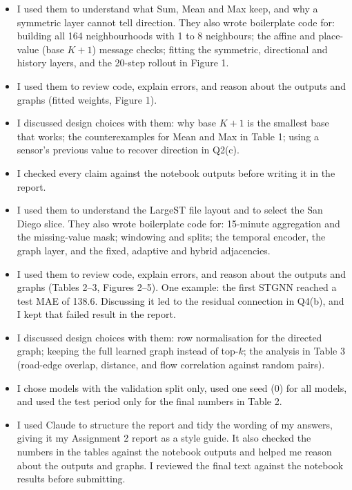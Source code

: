 
\begin{itemize}
    \item I used them to understand what Sum, Mean and Max keep, and why a symmetric layer cannot tell direction. They also wrote boilerplate code for: building all 164 neighbourhoods with 1 to 8 neighbours; the affine and place-value (base $K+1$) message checks; fitting the symmetric, directional and history layers, and the 20-step rollout in Figure 1.
    \item I used them to review code, explain errors, and reason about the outputs and graphs (fitted weights, Figure 1).
    \item I discussed design choices with them: why base $K+1$ is the smallest base that works; the counterexamples for Mean and Max in Table 1; using a sensor's previous value to recover direction in Q2(c).
    \item I checked every claim against the notebook outputs before writing it in the report.
\end{itemize}

\begin{itemize}
    \item I used them to understand the LargeST file layout and to select the San Diego slice. They also wrote boilerplate code for: 15-minute aggregation and the missing-value mask; windowing and splits; the temporal encoder, the graph layer, and the fixed, adaptive and hybrid adjacencies.
    \item I used them to review code, explain errors, and reason about the outputs and graphs (Tables 2--3, Figures 2--5). One example: the first STGNN reached a test MAE of 138.6. Discussing it led to the residual connection in Q4(b), and I kept that failed result in the report.
    \item I discussed design choices with them: row normalisation for the directed graph; keeping the full learned graph instead of top-$k$; the analysis in Table 3 (road-edge overlap, distance, and flow correlation against random pairs).
    \item I chose models with the validation split only, used one seed (0) for all models, and used the test period only for the final numbers in Table 2.
\end{itemize}

\begin{itemize}
    \item I used Claude to structure the report and tidy the wording of my answers, giving it my Assignment 2 report as a style guide. It also checked the numbers in the tables against the notebook outputs and helped me reason about the outputs and graphs. I reviewed the final text against the notebook results before submitting.
\end{itemize}
